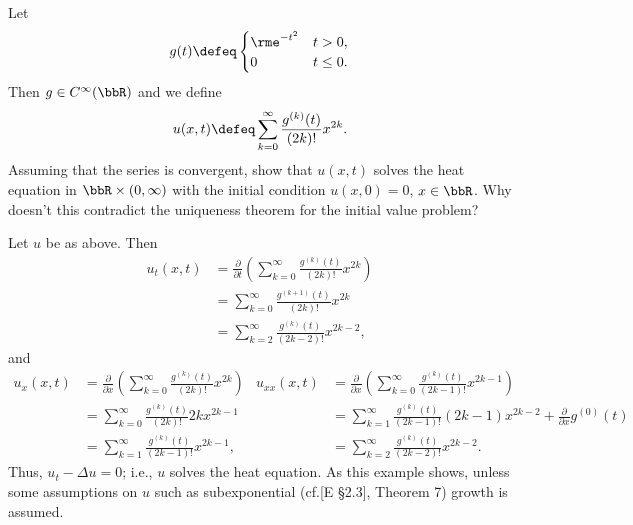 \begin{problem}
  Let
  \[
    g(t)\defeq
    \begin{cases}
      \rme^{-t^2}&t>0,\\
      0&t\leq 0.
    \end{cases}
  \]
  Then \(g\in C^\infty(\bbR)\) and we define
  \[
    u(x,t)\defeq\sum_{k=0}^\infty\frac{g^{(k)}(t)}{(2k)!}x^{2k}.
  \]
  Assuming that the series is convergent, show that \(u(x,t)\) solves the
  heat equation in \(\bbR\times(0,\infty)\) with the initial condition
  \(u(x,0)=0\), \(x\in\bbR\). Why doesn't this contradict the uniqueness
  theorem for the initial value problem?
\end{problem}
\begin{solution}
  Let \(u\) be as above. Then
  \begin{align*}
    u_t(x,t)
    &=\frac{\partial}{\partial t}
      \left(
      \sum_{k=0}^\infty\frac{g^{(k)}(t)}{(2k)!}x^{2k}
      \right)\\
    &=\sum_{k=0}^\infty \frac{g^{(k+1)}(t)}{(2k)!}x^{2k}\\
    &=\sum_{k=2}^\infty \frac{g^{(k)}(t)}{(2k-2)!}x^{2k-2},
  \end{align*}
  and
  \begin{align*}
    u_x(x,t)
    &=\frac{\partial}{\partial x}
      \left(
      \sum_{k=0}^\infty\frac{g^{(k)}(t)}{(2k)!}x^{2k}
      \right)
    &u_{xx}(x,t)
    &=\frac{\partial}{\partial x}
      \left(
      \sum_{k=0}^\infty\frac{g^{(k)}(t)}{(2k-1)!}x^{2k-1}
      \right)\\
    &=\sum_{k=0}^\infty\frac{g^{(k)}(t)}{(2k)!} 2kx^{2k-1}
    &&=\sum_{k=1}^\infty \frac{g^{(k)}(t)}{(2k-1)!}(2k-1)x^{2k-2}
       +\tfrac{\partial}{\partial x}g^{(0)}(t)\\
    &=\sum_{k=1}^\infty\frac{g^{(k)}(t)}{(2k-1)!}x^{2k-1},
    &&=\sum_{k=2}^\infty\frac{g^{(k)}(t)}{(2k-2)!}x^{2k-2}.
  \end{align*}
  Thus, \(u_t-\Delta u=0\); i.e., \(u\) solves the heat equation. As this
  example shows, unless some assumptions on \(u\) such as subexponential
  (cf.\@ [E \S 2.3], Theorem 7) growth is assumed.
\end{solution}
\newpage

